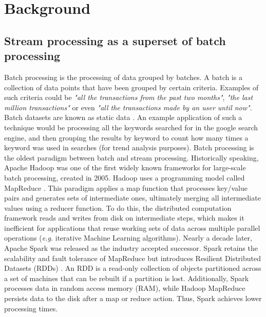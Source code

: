 \chapter{Background}\label{chap:background} \minitoc

\section{Stream processing as a superset of batch processing} \label{sec:stream-superset}

Batch processing is the processing of data grouped by batches. A batch is a collection of data points that have been grouped by certain criteria. Examples of such criteria could be \textit{"all the transactions from the past two months"}, \textit{"the last million transactions"} or even \textit{"all the transactions made by an user until now"}. Batch datasets are known as static data \cite{Martin-Batch-Defin}. An example application of such a technique would be processing all the keywords searched for in the google search engine, and then grouping the results by keyword to count how many times a keyword was used in searches (for trend analysis purposes). Batch processing is the oldest paradigm between batch and stream processing. Historically speaking, Apache Hadoop \cite{borthakur2007hadoop} \cite{Hadoop} \cite{ApacheHadoop} was one of the first widely known frameworks for large-scale batch processing, created in 2005. Hadoop uses a programming model called MapReduce \cite{MapReduce}. This paradigm applies a map function that processes key/value pairs and generates sets of intermediate ones, ultimately merging all intermediate values
using a reducer function. To do this, the distributed computation framework reads and writes from disk on intermediate steps, which makes it inefficient for applications that reuse working sets of data across multiple parallel operations (\textit{e.g.} iterative Machine Learning algorithms). Nearly a decade later, Apache Spark \cite{ApacheSpark} \cite{Spark} was released as the industry accepted successor.
Spark retains the scalability and fault tolerance of MapReduce but introduces Resilient Distributed Datasets (RDDs) \cite{SparkRDDs}. An RDD is a read-only collection of objects partitioned across a set of machines that can be rebuilt if a partition is lost.
Additionally, Spark processes data in random access memory (RAM), while Hadoop MapReduce persists data to the disk after a map or reduce action. Thus, Spark achieves lower processing times. 

